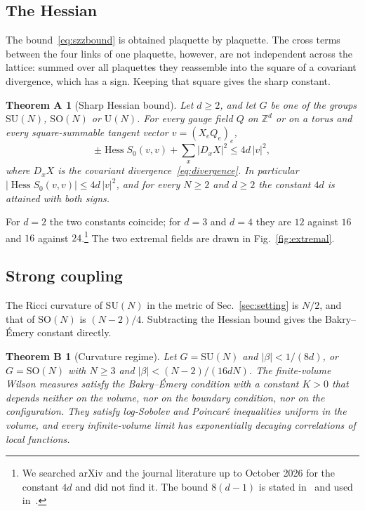 \documentclass[aps,prd,twocolumn,superscriptaddress,nofootinbib,longbibliography,floatfix,amsmath,amssymb,10pt]{revtex4-2}
\newtheorem*{theoremA}{Theorem A}
\newtheorem*{theoremB}{Theorem B}
\theoremstyle{definition}
\theoremstyle{remark}
\newcommand{\Z}{\mathbb{Z}}
\newcommand{\SU}{\mathrm{SU}}
\newcommand{\SO}{\mathrm{SO}}
\newcommand{\U}{\mathrm{U}}
\newcommand{\Hess}{\operatorname{Hess}}
\begin{document}
\subsection{The Hessian}

The bound~\eqref{eq:szzbound} is obtained plaquette by plaquette. The cross
terms between the four links of one plaquette, however, are not independent
across the lattice: summed over all plaquettes they reassemble into the
square of a covariant divergence, which has a sign. Keeping that square
gives the sharp constant.

\begin{theoremA}[Sharp Hessian bound]
Let $d\ge2$, and let $G$ be one of the groups $\SU(N)$, $\SO(N)$ or $\U(N)$.
For every gauge field $Q$ on $\Z^d$ or on a torus and every square-summable
tangent vector $v=(X_eQ_e)_e$,
\[
\pm\Hess S_0(v,v)+\sum_x|D_xX|^2\le 4d\,|v|^2,
\]
where $D_xX$ is the covariant divergence~\eqref{eq:divergence}. In
particular $|\Hess S_0(v,v)|\le 4d\,|v|^2$, and for every $N\ge2$ and $d\ge2$
the constant $4d$ is attained with both signs.
\end{theoremA}

For $d=2$ the two constants coincide; for $d=3$ and $d=4$ they are $12$
against $16$ and $16$ against $24$.\footnote{We searched arXiv and the
journal literature up to October 2026 for the constant $4d$ and did not find
it. The bound $8(d-1)$ is stated in~\cite[Lemma~4.1]{SZZ23} and used
in~\cite{CNS25b,Nis25,SSZ26}.} The two extremal fields are drawn in
Fig.~\ref{fig:extremal}.

\subsection{Strong coupling}

The Ricci curvature of $\SU(N)$ in the metric of Sec.~\ref{sec:setting} is
$N/2$, and that of $\SO(N)$ is $(N-2)/4$. Subtracting the Hessian bound gives
the Bakry--\'Emery constant directly.

\begin{theoremB}[Curvature regime]
Let $G=\SU(N)$ and $|\beta|<1/(8d)$, or $G=\SO(N)$ with $N\ge3$ and
$|\beta|<(N-2)/(16dN)$. The finite-volume Wilson measures satisfy the
Bakry--\'Emery condition with a constant $K>0$ that depends neither on the
volume, nor on the boundary condition, nor on the configuration. They
satisfy log-Sobolev and Poincar\'e inequalities uniform in the volume, and
every infinite-volume limit has exponentially decaying correlations of local
functions.
\end{theoremB}
\end{document}
